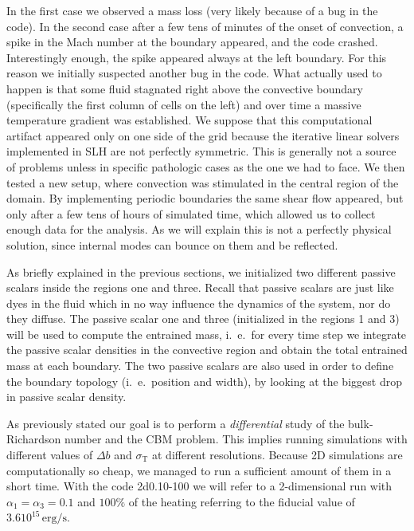 In the first case we observed a mass loss (very likely because of a bug in the code). In the second case after a few tens of minutes of the onset of convection, a spike in the Mach number at the boundary appeared, and the code crashed. Interestingly enough, the spike appeared always at the left boundary. For this reason we initially suspected another bug in the code. What actually used to happen is that some fluid stagnated right above the convective boundary (specifically the first column of cells on the left) and over time a massive temperature gradient was established. We suppose that this computational artifact appeared only on one side of the grid because the iterative linear solvers implemented in SLH are not perfectly symmetric. This is generally not a source of problems unless in specific pathologic cases as the one we had to face. We then tested a new setup, where convection was stimulated in the central region of the domain. By implementing periodic boundaries the same shear flow appeared, but only after a few tens of hours of simulated time, which allowed us to collect enough data for the analysis. As we will explain this is not a perfectly physical solution, since internal modes can bounce on them and be reflected.


As briefly explained in the previous sections, we initialized two different passive scalars inside the regions one and three. Recall that passive scalars are just like dyes in the fluid which in no way influence the dynamics of the system, nor do they diffuse. The passive scalar one and three (initialized in the regions 1 and 3) will be used to compute the entrained mass, i.\ e.\ for every time step we integrate the passive scalar densities in the convective region and obtain the total entrained mass at each boundary. The two passive scalars are also used in order to define the boundary topology (i.\ e.\  position and width), by looking at the biggest drop in passive scalar density.

As previously stated our goal is to perform a \textit{differential} study of the bulk-Richardson number and the CBM problem. This implies running simulations with different values of $\Delta b$ and $\sigma_{\mathrm{T}}$ at different resolutions. Because 2D simulations are computationally so cheap, we managed to run a  sufficient amount of them in a short time. With the code 2d0.10-100 we will refer to a 2-dimensional run with $\alpha_{1} = \alpha_{3}=0.1$ and $100 \%$ of the heating referring to the fiducial value of $3.6 10^{15} \, \mathrm{erg/s}$.

